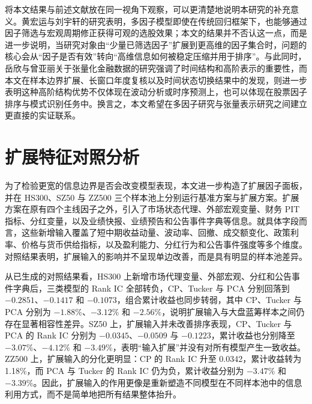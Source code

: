 将本文结果与前述文献放在同一视角下观察，可以更清楚地说明本研究的补充意义。黄宏运与刘宇轩的研究表明，多因子模型即使在传统回归框架下，也能够通过因子筛选与宏观周期修正获得可观的选股效果；本文的结果并不否认这一点，而是进一步说明，当研究对象由“少量已筛选因子”扩展到更高维的因子集合时，问题的核心会从“因子是否有效”转向“高维信息如何被稳定压缩并用于排序”。与此同时，岳欣与曾亚丽关于张量化金融数据的研究强调了时间结构和高阶表示的重要性，而本文在样本边界扩展、长窗口年度复核以及时间状态切换结果中的发现，则进一步表明这种高阶结构优势不仅体现在波动分析或时序预测上，也可以体现在股票因子排序与模式识别任务中。换言之，本文希望在多因子研究与张量表示研究之间建立更直接的实证联系。

\section{扩展特征对照分析}

为了检验更宽的信息边界是否会改变模型表现，本文进一步构造了扩展因子面板，并在 HS300、SZ50 与 ZZ500 三个样本池上分别运行基准方案与扩展方案。扩展方案在原有四个主线因子之外，引入了市场状态代理、外部宏观变量、财务 PIT 指标、分红变量，以及业绩快报、业绩预告和公告事件字典等信息。就具体字段而言，这些新增输入覆盖了短中期收益动量、波动率、回撤、成交额变化、政策利率、价格与货币供给指标，以及盈利能力、分红行为和公告事件强度等多个维度。对照结果表明，扩展输入的影响并不呈现单边改善，而是具有明显的样本池差异。

从已生成的对照结果看，HS300 上新增市场代理变量、外部宏观、分红和公告事件字典后，三类模型的 Rank IC 全部转负，CP、Tucker 与 PCA 分别回落到 $-0.2851$、$-0.1417$ 和 $-0.1073$，组合累计收益也同步转弱，其中 CP、Tucker 与 PCA 分别为 $-1.88\%$、$-3.12\%$ 和 $-2.56\%$，说明扩展输入与大盘蓝筹样本之间仍存在显著相容性差异。SZ50 上，扩展输入并未改善排序表现，CP、Tucker 与 PCA 的 Rank IC 分别为 $-0.0345$、$-0.0509$ 与 $-0.1223$，累计收益也分别降至 $-3.07\%$、$-4.12\%$ 和 $-3.49\%$，表明“输入扩展”并没有对所有模型产生一致收益。ZZ500 上，扩展输入的分化更明显：CP 的 Rank IC 升至 0.0342，累计收益转为 1.18\%，而 PCA 与 Tucker 的 Rank IC 仍为负，累计收益分别为 $-3.47\%$ 和 $-3.39\%$。因此，扩展输入的作用更像是重新塑造不同模型在不同样本池中的信息利用方式，而不是简单地把所有结果整体抬升。

